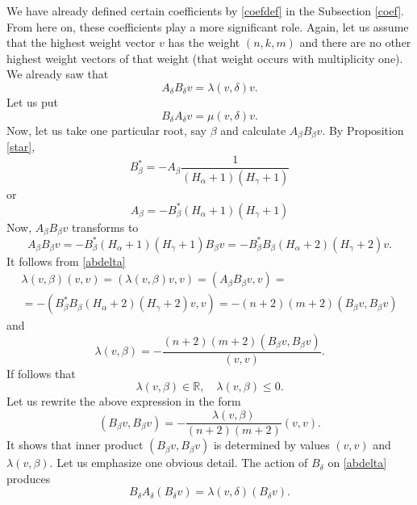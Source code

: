 \documentclass[twoside,a4paper,12pt]{article}
\newcommand{\R}{\ensuremath{\mathbb R}}
\theoremstyle{definition}
\begin{document}
We have already defined certain coefficients by \eqref{coefdef} in the
Subsection \ref{coef}. From here on, these coefficients play a more significant
role. Again, let us assume that the highest weight vector $v$ has the weight
$(n,k,m)$ and there are no other highest weight vectors of that weight
(that weight occurs with multiplicity one). We already saw that
\begin{equation}\label{abdelta}
	A_\delta B_\delta v=\lambda(v,\delta) v.
\end{equation}
Let us put
\begin{equation}\label{badelta}
	B_\delta A_\delta v=\mu(v,\delta) v.
\end{equation}
Now, let us take one particular root, say
$\beta$ and calculate $A_\beta B_\beta v$. By Proposition \ref{star},
\begin{equation}\label{bstar}
	B_\beta^*=-A_\beta\frac1{(H_\alpha+1)(H_\gamma+1)}
\end{equation}
or
\begin{equation*}
	A_\beta=-B_\beta^*(H_\alpha+1)(H_\gamma+1)
\end{equation*}
Now, $A_\beta B_\beta v$ transforms to
\begin{equation*}
	A_\beta B_\beta v=-B_\beta^*(H_\alpha+1)(H_\gamma+1)B_\beta v=
	-B_\beta^*B_\beta(H_\alpha+2)(H_\gamma+2)v.
\end{equation*}
It follows from \eqref{abdelta}
\begin{gather*}
	\lambda(v,\beta)(v,v)=(\lambda(v,\beta)v,v)=(A_\beta B_\beta v,v)=\\
	=-(B_\beta^*B_\beta(H_\alpha+2)(H_\gamma+2)v,v)=
	-(n+2)(m+2)(B_\beta v,B_\beta v)
\end{gather*}
and
\begin{equation*}
	\lambda(v,\beta)=-\frac{(n+2)(m+2)(B_\beta v,B_\beta v)}{(v,v)}.
\end{equation*}
If follows that
\begin{equation}\label{bneg}
	\lambda(v,\beta)\in\R,\quad\lambda(v,\beta)\leq0.
\end{equation}
Let us rewrite the above expression in the form
\begin{equation}\label{bvbv}
	(B_\beta v,B_\beta v)=-\frac{\lambda(v,\beta)}{(n+2)(m+2)}(v,v).
\end{equation}
It shows that inner product $(B_\beta v,B_\beta v)$ is determined by values
$(v,v)$ and $\lambda(v,\beta)$.
Let us emphasize one obvious detail. The action of $B_\delta$ on \eqref{abdelta}
produces
\begin{equation*}%
	B_\delta A_\delta(B_\delta v)=\lambda(v,\delta)(B_\delta v).
\end{equation*}
\end{document}
